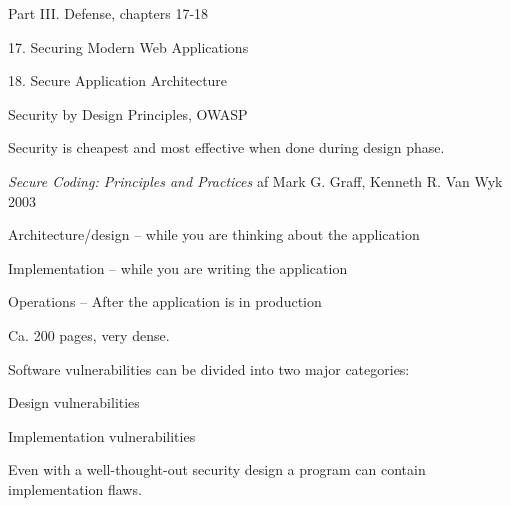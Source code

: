 \documentclass[Screen16to9,17pt]{foils}
\begin{document}
\begin{list1}
\item Part III. Defense, chapters 17-18
\item 17. Securing Modern Web Applications
\item 18. Secure Application Architecture

\item Security by Design Principles, OWASP\\
\end{list1}



\centerline{Security is cheapest and most effective when done during design phase.}




\vskip 2cm
{\emph{Secure Coding: Principles and Practices} af Mark G. Graff, Kenneth R. Van Wyk 2003}



\begin{list1}
\item Architecture/design -- while you are thinking about the application
\item Implementation -- while you are writing the application
\item Operations -- After the application is in production
\item Ca. 200 pages, very dense.
\end{list1}




Software vulnerabilities can be divided into two major categories:
\begin{list2}
\item Design vulnerabilities
\item Implementation vulnerabilities
\end{list2}

Even with a well-thought-out security design a program can contain implementation flaws.


\end{document}
